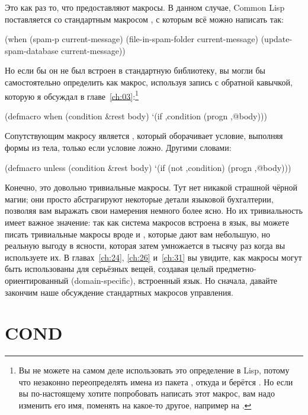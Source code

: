 Это как раз то, что предоставляют макросы. В данном случае, Common Lisp поставляется со
стандартным макросом , с которым всё можно написать так:

\begin{myverb}
(when (spam-p current-message)
  (file-in-spam-folder current-message)
  (update-spam-database current-message))
\end{myverb}

Но если бы он не был встроен в стандартную библиотеку, вы могли бы самостоятельно
определить  как макрос, используя запись с обратной кавычкой, которую я
обсуждал в главе~\ref{ch:03}:\footnote{Вы не можете на самом деле использовать это определение в
  Lisp, потому что незаконно переопределять имена из пакета , откуда и
  берётся . Но если вы по-настоящему хотите попробовать написать этот макрос,
  вам надо изменить его имя, поменять на какое-то другое, например на .}

\begin{myverb}
(defmacro when (condition &rest body)
  `(if ,condition (progn ,@body)))
\end{myverb}

Сопутствующим макросу  является , который оборачивает условие,
выполняя формы из тела, только если условие ложно. Другими словами:

\begin{myverb}
(defmacro unless (condition &rest body)
  `(if (not ,condition) (progn ,@body)))
\end{myverb}

Конечно, это довольно тривиальные макросы. Тут нет никакой страшной чёрной магии; они
просто абстрагируют некоторые детали языковой бухгалтерии, позволяя вам выражать свои
намерения немного более ясно. Но их тривиальность имеет важное значение: так как система
макросов встроена в язык, вы можете писать тривиальные макросы вроде  и
, которые дают вам небольшую, но реальную выгоду в ясности, которая затем
умножается в тысячу раз когда вы используете их. В главах~\ref{ch:24}, \ref{ch:26}
и~\ref{ch:31} вы увидите, как макросы могут быть использованы для серьёзных вещей,
создавая целый предметно-ориентированный (domain-specific), встроенный язык. Но сначала,
давайте закончим наше обсуждение стандартных макросов управления.

\section{COND}

